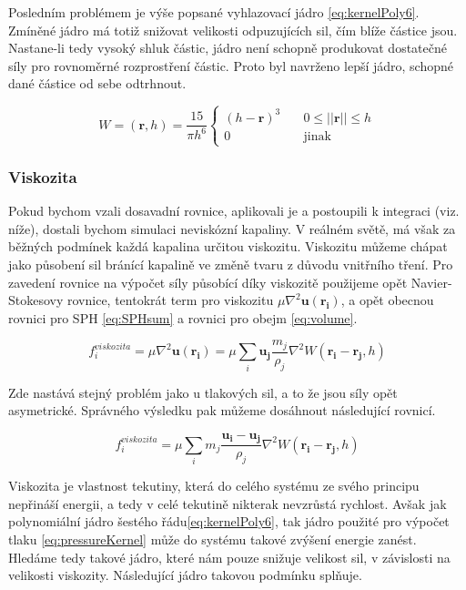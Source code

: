 Posledním problémem je výše popsané vyhlazovací jádro \ref{eq:kernelPoly6}. Zmíněné jádro má totiž snižovat velikosti odpuzujících sil, čím blíže částice jsou. Nastane-li tedy vysoký shluk částic, jádro není schopně produkovat dostatečné síly pro rovnoměrné rozprostření částic. Proto byl navrženo \cite{Desbrun96} lepší jádro, schopné dané částice od sebe odtrhnout.

\begin{equation}
    W = (\mathbf{r}, h) = \frac{15}{\pi h^6} 
    \begin{cases}
      (h - \mathbf{r})^3 & \quad 0 \leq ||\mathbf{r}|| \leq h \\
      0 & \quad \text{jinak}
    \end{cases}
    \label{eq:pressureKernel}
\end{equation}
    
\subsubsection{Viskozita}
Pokud bychom vzali dosavadní rovnice, aplikovali je a postoupili k integraci (viz. níže), dostali bychom simulaci neviskózní kapaliny. V reálném světě, má však za běžných podmínek každá kapalina určitou viskozitu. Viskozitu můžeme chápat jako působení sil bránící kapalině ve změně tvaru z důvodu vnitřního tření. Pro zavedení rovnice na výpočet síly působící díky viskozitě použijeme opět Navier-Stokesovy rovnice, tentokrát term pro viskozitu $\mu \nabla^2\mathbf{u}(\mathbf{r_i})$, a opět obecnou rovnici pro SPH \ref{eq:SPHsum} a rovnici pro obejm \ref{eq:volume}.

\begin{equation}
    f^{viskozita}_i = \mu \nabla^2\mathbf{u}(\mathbf{r_i}) = \mu \sum_i \mathbf{u_j} \frac{m_j}{\rho_j} \nabla^2 W(\mathbf{r_i} - \mathbf{r_j},h)
\end{equation}

Zde nastává stejný problém jako u tlakových sil, a to že jsou síly opět asymetrické. Správného výsledku pak můžeme dosáhnout následující rovnicí. \cite{Muller03}

\begin{equation}
    f^{viskozita}_i = \mu \sum_i m_j \frac{\mathbf{u_i} - \mathbf{u_j}}{\rho_j} \nabla^2 W(\mathbf{r_i} - \mathbf{r_j},h)
    \label{eq:ViscForce}
\end{equation}

Viskozita je vlastnost tekutiny, která do celého systému ze svého principu nepřináší energii, a tedy v celé tekutině nikterak nevzrůstá rychlost. Avšak jak polynomiální jádro šestého řádu\ref{eq:kernelPoly6}, tak jádro použité pro výpočet tlaku \ref{eq:pressureKernel} může do systému takové zvýšení energie zanést. Hledáme tedy takové jádro, které nám pouze snižuje velikost sil, v závislosti na velikosti viskozity. Následující jádro takovou podmínku splňuje. \cite{Muller03}

